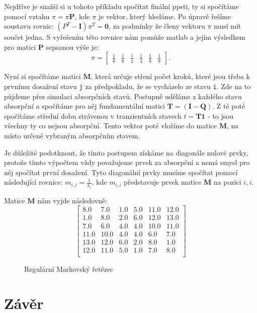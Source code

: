 \documentclass{article}
\begin{document}
Nejdříve je snažší si u tohoto příkladu spočítat finální ppsti, ty si spočítáme pomocí vztahu $\pi = \pi \mathbf{P}$, kde $\pi$ je vektor, který hledáme. Po úpravě řešíme soustavu rovnic: $(P^T - \mathbf{I})\pi^T = \mathbf{0}$, za podmínky že členy vektoru $\pi$ musí mít součet jedna.
S vyřešením této rovnice nám pomůže matlab a jejím výsledkem pro matici $\mathbf P$ sepsanou výše je:
\[
\pi = 
\begin{bmatrix}
    \frac 1 8 & \frac 1 8 & \frac 1 4 & \frac 1 4 &  \frac 1 8 & \frac 1 8 
\end{bmatrix}.
\]

Nyní si spočítáme matici $\mathbf{M}$, která určuje stření počet kroků, které jsou třeba k prvnímu dosažení stavu \verb|j| za předpokladu, že se vycházelo ze stavu \verb|i|. 
Zde na to půjdeme přes simulaci absorpčních stavů. 
Postupně uděláme z každého stavu absorpční a spočítáme pro něj fundamentální matici $\mathbf{T} = (\mathbf{I} - \mathbf{Q})$.
Z té poté spočítáme střední dobu strávenou v tranzientních stavech $t = \mathbf{T}\mathbf{1}$ - to jsou všechny ty co nejsou absorpční. 
Tento vektor poté vložíme do matice $\mathbf{M}$, na místo určené vybraným absorpčním stavem. 

Je důležité podotknout, že tímto postupem získáme na diagonále nulové prvky, protože tímto výpočtem vždy považujeme prvek za absorpční a nemá smysl pro něj spočítat první dosažení.
Tyto diagonální prvky musíme spočítat pomocí následující rovnice: $m_{i,i}=\frac{1}{\pi_i}$, kde $m_{i,i}$ představuje prvek matice $\mathbf{M}$ na pozici $i,i$.

Matice $\mathbf{M}$ nám vyjde následovně:
\[
\begin{bmatrix}
8.0 & 7.0 & 1.0 & 5.0 & 11.0 & 12.0 \\
1.0 & 8.0 & 2.0 & 6.0 & 12.0 & 13.0 \\
7.0 & 6.0 & 4.0 & 4.0 & 10.0 & 11.0 \\
11.0 & 10.0 & 4.0 & 4.0 & 6.0 & 7.0 \\
13.0 & 12.0 & 6.0 & 2.0 & 8.0 & 1.0 \\
12.0 & 11.0 & 5.0 & 1.0 & 7.0 & 8.0 \\
\end{bmatrix}
\]

\begin{figure}
\centering
{}
\caption{Regulární Markovský řetězec}
\label{fig:markov_chain_1}
    
\end{figure}
\section{Závěr}
\end{document}
